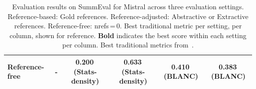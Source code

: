 \begin{table}[h]
\begin{tabular}{lccccc}
\rowcolor{reffree}
Reference-free & - & 0.200\,(Stats-density) & 0.633\,(Stats-density) & 0.410\,(BLANC) & 0.383\,(BLANC) \\
\bottomrule
\end{tabular}
\caption[Evaluation results on SummEval for Mistral across three evaluation settings.]{%
  Evaluation results on SummEval for Mistral across three evaluation settings.   \colorbox{refbased}{\vphantom{x} Reference-based}: Gold references.
  \colorbox{refadj}{\vphantom{x} Reference-adjusted}: Abstractive or Extractive references.
  \colorbox{reffree}{\vphantom{x} Reference-free}: nrefs\,=\,0.
Best traditional metric per setting, per column, shown for reference.  \textbf{Bold} indicates the best score within each setting per column. Best traditional metrics from~.
}
\label{tab:combined-mistral}
\end{table}

